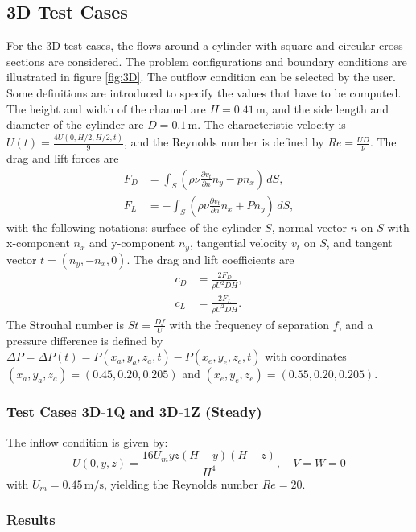 \documentclass{article}
\begin{document}
\subsection{3D Test Cases}
For the 3D test cases, the flows around a cylinder with square and circular cross-sections are considered. The problem configurations and boundary conditions are illustrated in figure \ref{fig:3D}. The outflow condition can be selected by the user. Some definitions are introduced to specify the values that have to be computed. The height and width of the channel are \(H = 0.41 \, \text{m}\), and the side length and diameter of the cylinder are \(D = 0.1 \, \text{m}\). The characteristic velocity is \(U(t) = \frac{4U(0, H/2, H/2, t)}{9}\), and the Reynolds number is defined by \(Re = \frac{UD}{\nu}\). The drag and lift forces are
\begin{align*}
    F_D &= \int_S \left(\rho\nu \frac{\partial v_t}{\partial n}n_y - p n_x\right) \, dS, \\
    F_L &= -\int_S \left(\rho\nu \frac{\partial v_t}{\partial n}n_x + P n_y\right) \, dS,
\end{align*}
with the following notations: surface of the cylinder \(S\), normal vector \(n\) on \(S\) with x-component \(n_x\) and y-component \(n_y\), tangential velocity \(v_t\) on \(S\), and tangent vector \(t = (n_y, -n_x, 0)\). The drag and lift coefficients are
\begin{align*}
    c_D &= \frac{2F_D}{\rho U^2 D H}, \\
    c_L &= \frac{2F_L}{\rho U^2 D H}.
\end{align*}
The Strouhal number is \(St = \frac{Df}{U}\) with the frequency of separation \(f\), and a pressure difference is defined by \(\Delta P = \Delta P(t) = P(x_a, y_a, z_a, t) - P(x_e, y_e, z_e, t)\) with coordinates \((x_a, y_a, z_a) = (0.45, 0.20, 0.205)\) and \((x_e, y_e, z_e) = (0.55, 0.20, 0.205)\).
\subsubsection{Test Cases 3D-1Q and 3D-1Z (Steady)}


The inflow condition is given by:
\[
U(0, y, z) = \frac{16U_m yz (H - y)(H - z)}{H^4}, \quad V = W = 0
\]
with \(U_m = 0.45 \, \text{m/s}\), yielding the Reynolds number \(Re = 20\). 

\subsubsection*{Results}
\end{document}

